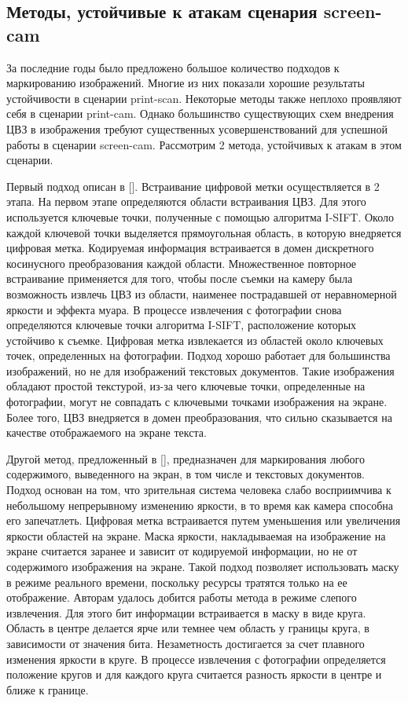 \documentclass[12pt,a4paper]{article}
\begin{document}
\subsection{Методы, устойчивые к атакам сценария screen-cam}
За последние годы было предложено большое количество подходов к маркированию изображений.
Многие из них показали хорошие результаты устойчивости в сценарии print-scan.
Некоторые методы также неплохо проявляют себя в сценарии print-cam.
Однако большинство существующих схем внедрения ЦВЗ в изображения требуют существенных усовершенствований для успешной работы в сценарии screen-cam. 
Рассмотрим 2 метода, устойчивых к атакам в этом сценарии.

Первый подход описан в [].
Встраивание цифровой метки осуществляется в 2 этапа.
На первом этапе определяются области встраивания ЦВЗ.
Для этого используется ключевые точки, полученные с помощью алгоритма I-SIFT.
Около каждой ключевой точки выделяется прямоугольная область, в которую внедряется цифровая метка.
Кодируемая информация встраивается в домен дискретного косинусного преобразования каждой области.
Множественное повторное встраивание применяется для того, чтобы после съемки на камеру была возможность извлечь ЦВЗ из области, наименее пострадавшей от неравномерной яркости и эффекта муара.
В процессе извлечения с фотографии снова определяются ключевые точки алгоритма I-SIFT, расположение которых устойчиво к съемке.
Цифровая метка извлекается из областей около ключевых точек, определенных на фотографии.
Подход хорошо работает для большинства изображений, но не для изображений текстовых документов.
 Такие изображения обладают простой текстурой, из-за чего ключевые точки, определенные на фотографии, могут не совпадать с ключевыми точками изображения на экране. Более того, ЦВЗ внедряется в домен преобразования, что сильно сказывается на качестве отображаемого на экране текста. 

Другой метод, предложенный в [], предназначен для маркирования любого содержимого, выведенного на экран, в том числе и текстовых документов.
Подход основан на том, что зрительная система человека слабо восприимчива к небольшому непрерывному изменению яркости, в то время как камера способна его запечатлеть.
Цифровая метка встраивается путем уменьшения или увеличения яркости областей на экране.
Маска яркости, накладываемая на изображение на экране считается заранее и зависит от кодируемой информации, но не от содержимого изображения на экране.
Такой подход позволяет использовать маску в режиме реального времени, поскольку ресурсы тратятся только на ее отображение.
Авторам удалось добится работы метода в режиме слепого извлечения.
Для этого бит информации встраивается в маску в виде круга.
Область в центре делается ярче или темнее чем область у границы круга, в зависимости от значения бита.
Незаметность достигается за счет плавного изменения яркости в круге.
В процессе извлечения с фотографии определяется положение кругов и для каждого круга считается разность яркости в центре и ближе к границе.
\end{document}
